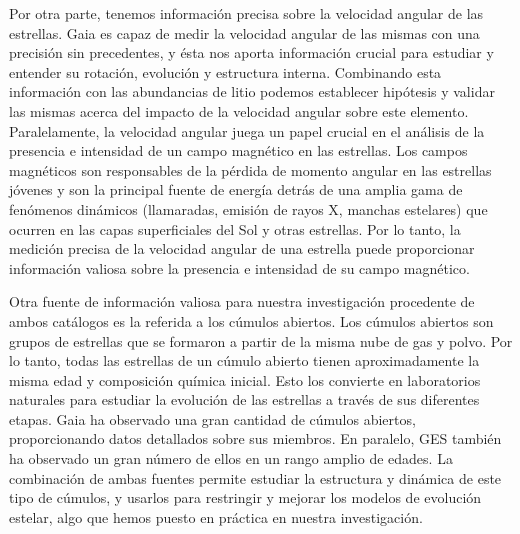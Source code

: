 Por otra parte, tenemos información precisa sobre la velocidad angular de las estrellas. Gaia es capaz de medir la velocidad angular de las mismas con una precisión sin precedentes, y ésta nos aporta información crucial para estudiar y entender su rotación, evolución y estructura interna. Combinando esta información con las abundancias de litio podemos establecer hipótesis y validar las mismas acerca del impacto de la velocidad angular sobre este elemento. Paralelamente, la velocidad angular juega un papel crucial en el análisis de la presencia e intensidad de un campo magnético en las estrellas. Los campos magnéticos son responsables de la pérdida de momento angular en las estrellas jóvenes y son la principal fuente de energía detrás de una amplia gama de fenómenos dinámicos (llamaradas, emisión de rayos X, manchas estelares) que ocurren en las capas superficiales del Sol y otras estrellas. Por lo tanto, la medición precisa de la velocidad angular de una estrella puede proporcionar información valiosa sobre la presencia e intensidad de su campo magnético.\par

Otra fuente de información valiosa para nuestra investigación procedente de ambos catálogos es la referida a los cúmulos abiertos. Los cúmulos abiertos son grupos de estrellas que se formaron a partir de la misma nube de gas y polvo. Por lo tanto, todas las estrellas de un cúmulo abierto tienen aproximadamente la misma edad y composición química inicial. Esto los convierte en laboratorios naturales para estudiar la evolución de las estrellas a través de sus diferentes etapas. Gaia ha observado una gran cantidad de cúmulos abiertos, proporcionando datos detallados sobre sus miembros. En paralelo, GES también ha observado un gran número de ellos en un rango amplio de edades. La combinación de ambas fuentes permite estudiar la estructura y dinámica de este tipo de cúmulos, y usarlos para restringir y mejorar los modelos de evolución estelar, algo que hemos puesto en práctica en nuestra investigación.\par


